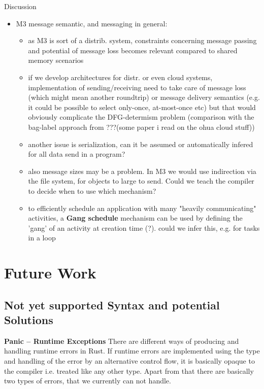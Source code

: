 Discussion
\begin{itemize}
    \item M3 message semantic, and messaging in general:
    \begin{itemize}
        \item as M3 is sort of a distrib. system, constraints concerning message passing and potential of message loss becomes relevant compared to shared memory scenarios
        \item if we develop architectures for distr. or even cloud systems, implementation of sending/receiving need to take care of message loss (which might mean another roundtrip) or message delivery semantics (e.g. it could be possible to select only-once, at-most-once etc) but that would obviously complicate the DFG-determism problem 
        (comparison with the bag-label approach from ???(some paper i read on the ohua cloud stuff))
        \item another issue is serialization, can it be assumed or automatically infered for all data send in a program?
        \item also message sizes may be a problem. In M3 we would use indirection via the file system, for objects to large to send. Could we teach the compiler to decide when to use which mechanism?
        \item to efficiently schedule an application with many "heavily communicating" activities, a \textbf{Gang schedule} mechanism can be used  by defining the 'gang' of an activity at creation time (?). \means could we infer this, e.g. for tasks in a loop
    \end{itemize}
\end{itemize}



\section{Future Work}
\subsection{Not yet supported Syntax and potential Solutions}

\textbf{Panic -- Runtime Exceptions} 
There are different ways of producing and handling runtime errors in Rust. If runtime errors are implemented using the  type and handling of the error by an alternative control flow, it is basically opaque to the compiler i.e. treated like any other type. Apart from that there are basically two types of errors, that we currently can not handle. 

